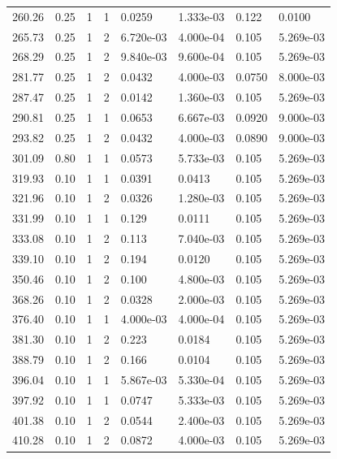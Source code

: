 \documentclass[preview]{standalone}
\begin{document}
{{{\begin{tabular}{L{1.2cm}C{1.2cm} C{0.3cm}C{0.5cm} C{1.4cm}C{1.4cm} C{1.4cm}C{1.4cm}}
  260.26  &  0.25  & 1     &  1 &  0.0259  & 1.333e-03  & 0.122 &  0.0100   \\ 
  265.73  &  0.25  & 1     &  2 &  6.720e-03  & 4.000e-04  & 0.105 &  5.269e-03   \\ 
  268.29  &  0.25  & 1     &  2 &  9.840e-03  & 9.600e-04  & 0.105 &  5.269e-03   \\ 
  281.77  &  0.25  & 1     &  2 &  0.0432  & 4.000e-03  & 0.0750 &  8.000e-03   \\ 
  287.47  &  0.25  & 1     &  2 &  0.0142  & 1.360e-03  & 0.105 &  5.269e-03   \\ 
  290.81  &  0.25  & 1     &  1 &  0.0653  & 6.667e-03  & 0.0920 &  9.000e-03   \\ 
  293.82  &  0.25  & 1     &  2 &  0.0432  & 4.000e-03  & 0.0890 &  9.000e-03   \\ 
  301.09  &  0.80  & 1     &  1 &  0.0573  & 5.733e-03  & 0.105 &  5.269e-03   \\ 
  319.93  &  0.10  & 1     &  1 &  0.0391  & 0.0413  & 0.105 &  5.269e-03   \\ 
  321.96  &  0.10  & 1     &  2 &  0.0326  & 1.280e-03  & 0.105 &  5.269e-03   \\ 
  331.99  &  0.10  & 1     &  1 &  0.129  & 0.0111  & 0.105 &  5.269e-03   \\ 
  333.08  &  0.10  & 1     &  2 &  0.113  & 7.040e-03  & 0.105 &  5.269e-03   \\ 
  339.10  &  0.10  & 1     &  2 &  0.194  & 0.0120  & 0.105 &  5.269e-03   \\ 
  350.46  &  0.10  & 1     &  2 &  0.100  & 4.800e-03  & 0.105 &  5.269e-03   \\ 
  368.26  &  0.10  & 1     &  2 &  0.0328  & 2.000e-03  & 0.105 &  5.269e-03   \\ 
  376.40  &  0.10  & 1     &  1 &  4.000e-03  & 4.000e-04  & 0.105 &  5.269e-03   \\ 
  381.30  &  0.10  & 1     &  2 &  0.223  & 0.0184  & 0.105 &  5.269e-03   \\ 
  388.79  &  0.10  & 1     &  2 &  0.166  & 0.0104  & 0.105 &  5.269e-03   \\ 
  396.04  &  0.10  & 1     &  1 &  5.867e-03  & 5.330e-04  & 0.105 &  5.269e-03   \\ 
  397.92  &  0.10  & 1     &  1 &  0.0747  & 5.333e-03  & 0.105 &  5.269e-03   \\ 
  401.38  &  0.10  & 1     &  2 &  0.0544  & 2.400e-03  & 0.105 &  5.269e-03   \\ 
  410.28  &  0.10  & 1     &  2 &  0.0872  & 4.000e-03  & 0.105 &  5.269e-03   \\ 

\end{tabular}}}}
\end{document}
